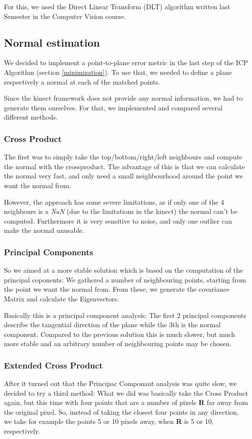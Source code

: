 \documentclass[10pt,twocolumn,letterpaper]{article}
\begin{document}
For this, we used the Direct Linear Transform (DLT) algorithm written last Semester in the Computer Vision course.

\subsection{Normal estimation}
We decided to implement a point-to-plane error metric in the last step of the ICP Algorithm (section \ref{minimization}).
To use that, we needed to define a plane respectively a normal at each of the matched points.

Since the kinect framework does not provide any normal information, we had to generate them ourselves.
For that, we implemented and compared several different methods.

\subsubsection{Cross Product}
The first was to simply take the top/bottom/right/left neighbours and compute the normal with the crossproduct.
The advantage of this is that we can calculate the normal very fast, and only need a small neighbourhood around the point
we want the normal from.

However, the approach has some severe limitations, as if only one of the 4 neighbours is a \textit{NaN}
(due to the limitations in the kinect) the normal can't be computed.
Furthermore it is very sensitive to noise, and only one outlier can make the normal unusable.

\subsubsection{Principal Components}
So we aimed at a more stable solution which is based on the computation of the principal coponents: We gathered a number of neighbouring
points, starting from the point we want the normal from. From these, we generate the covariance Matrix and calculate the Eigenvectors.

Basically this is a principal component analysis: The first 2 principal components describe the tangential direction of
the plane while the 3th is the normal component.
Compared to the previous solution this is much slower, but much more stable and an arbitrary number of neighbouring points may be chosen.

\subsubsection{Extended Cross Product}
After it turned out that the Principac Componant analysis was quite slow, we decided to try a third method: What we did was basically take the Cross
Product again, but this time with four points that are a number of pixels \textbf{R} far away from the original pixel. So, instead of taking the closest
four points in any direction, we take for example the points 5 or 10 pixels away, when \textbf{R} is 5 or 10, respectively.
\end{document}
